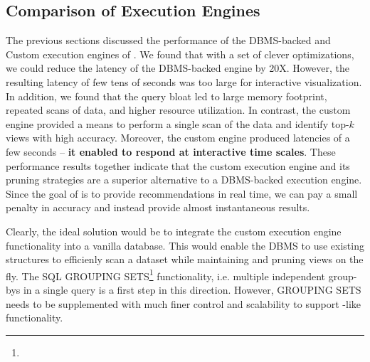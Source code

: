 \subsection{Comparison of Execution Engines}
\label{sec:comp_of_engines}

The previous sections discussed the performance of the DBMS-backed and Custom execution engines of \SeeDB.
We found that with a set of clever optimizations, we could reduce the latency of the DBMS-backed engine by
20X.
However, the resulting latency of few tens of seconds was too large for interactive visualization.
In addition, we found that the query bloat led to large memory footprint, repeated scans of data, and
higher resource utilization.
In contrast, the custom engine provided a means to perform a single scan of the data and identify top-$k$ views
with high accuracy. 
Moreover, the custom engine produced latencies of a few seconds -- {\bf it enabled \SeeDB to respond at interactive
time scales}.
These performance results together indicate that the custom execution engine and its pruning strategies are a superior 
alternative to a DBMS-backed execution engine.
Since the goal of \SeeDB is to provide recommendations in real time, we can pay a small penalty in accuracy 
and instead provide almost instantaneous results.

Clearly, the ideal solution would be to integrate the custom execution engine functionality into a vanilla database.
This would enable the DBMS to use existing structures to efficienly scan a dataset while maintaining and pruning
views on the fly. 
The SQL GROUPING SETS\footnote{} functionality, i.e. multiple independent group-bys in a single query is a first step in this direction.
However, GROUPING SETS needs to be supplemented with much finer control and scalability to support \SeeDB-like  functionality.




